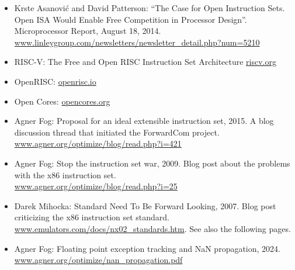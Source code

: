 \documentclass[forwardcom.tex]{subfiles}
\begin{document}
\begin{itemize}
\item
Krste Asanovi\'{c} and David Patterson: ``The Case for Open Instruction Sets. Open ISA Would Enable Free 
Competition in Processor Design''. Microprocessor Report, August 18, 2014. \\
\href{https://www.linleygroup.com/newsletters/newsletter_detail.php?num=5210}{www.linleygroup.com/newsletters/newsletter\_detail.php?num=5210}

\item
RISC-V: The Free and Open RISC Instruction Set Architecture
\href{https://riscv.org}{riscv.org}

\item
OpenRISC: 
\href{https://openrisc.io}{openrisc.io}

\item
Open Cores: 
\href{https://opencores.org}{opencores.org}

\item
Agner Fog: Proposal for an ideal extensible instruction set, 2015. A blog discussion thread that initiated the ForwardCom project. \\
\href{https://www.agner.org/optimize/blog/read.php?i=421}{www.agner.org/optimize/blog/read.php?i=421}

\item
Agner Fog: Stop the instruction set war, 2009. Blog post about the problems with the x86 instruction set. \\
\href{https://www.agner.org/optimize/blog/read.php?i=25}{www.agner.org/optimize/blog/read.php?i=25}

\item
Darek Mihocka: Standard Need To Be Forward Looking, 2007. Blog post criticizing the x86 instruction set standard. \\
\href{http://www.emulators.com/docs/nx02_standards.htm}{www.emulators.com/docs/nx02\_standards.htm}. See also the following pages.

\item
Agner Fog: Floating point exception tracking and NaN propagation, 2024. 
\href{https://www.agner.org/optimize/nan_propagation.pdf}{www.agner.org/optimize/nan\_propagation.pdf}


\end{itemize}
\end{document}
